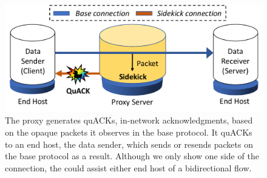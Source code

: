 \begin{figure}[t]
	\centering
	\includegraphics[width=\linewidth]{figures/sc_protocol.pdf}%
\caption{The proxy generates quACKs, in-network acknowledgments, based on
the opaque packets it observes in the base protocol. It quACKs to an end
host, the data sender, which sends or resends packets on the base protocol as a result.
Although we only show one side of the connection, the \sys could assist
either end host of a bidirectional flow.
\vspace{-0.4cm}
}
\label{fig:sc-protocols}
\end{figure}
